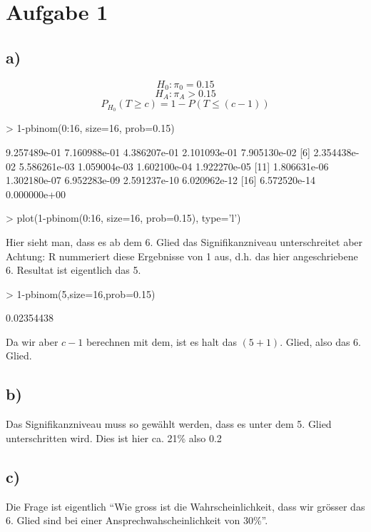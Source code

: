 \section{Aufgabe 1}

\subsection*{a)}
\[ H_0: \pi_0 = 0.15 \]
\[ H_A: \pi_A > 0.15 \]
\[ P_{H_0}(T \geq c) = 1- P(T \leq (c-1))\]

\begin{Schunk}
\begin{Sinput}
> 1-pbinom(0:16, size=16, prob=0.15)
\end{Sinput}
\begin{Soutput}
 [1] 9.257489e-01 7.160988e-01 4.386207e-01 2.101093e-01 7.905130e-02
 [6] 2.354438e-02 5.586261e-03 1.059004e-03 1.602100e-04 1.922270e-05
[11] 1.806631e-06 1.302180e-07 6.952283e-09 2.591237e-10 6.020962e-12
[16] 6.572520e-14 0.000000e+00
\end{Soutput}
\begin{Sinput}
> plot(1-pbinom(0:16, size=16, prob=0.15), type='l')
\end{Sinput}
\end{Schunk}
Hier sieht man, dass es ab dem 6. Glied das Signifikanzniveau unterschreitet
aber Achtung: R nummeriert diese Ergebnisse von 1 aus, d.h. das hier 
angeschriebene 6. Resultat ist eigentlich das 5.
\begin{Schunk}
\begin{Sinput}
> 1-pbinom(5,size=16,prob=0.15)
\end{Sinput}
\begin{Soutput}
[1] 0.02354438
\end{Soutput}
\end{Schunk}
Da wir aber $c-1$ berechnen mit dem, ist es halt das $(5+1)$. Glied, also das 
6. Glied.

\subsection*{b)}
Das Signifikanzniveau muss so gewählt werden, dass es unter dem 5. Glied 
unterschritten wird. Dies ist hier ca. 21\% also 0.2

\subsection{c)}
Die Frage ist eigentlich ``Wie gross ist die Wahrscheinlichkeit, dass
wir grösser das 6. Glied sind bei einer Ansprechwahscheinlichkeit von 30\%''.

